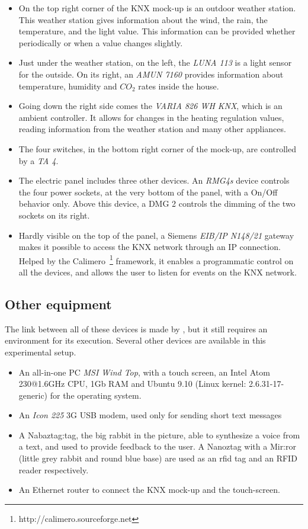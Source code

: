 \begin{itemize}
\item On the top right corner of the KNX mock-up is an outdoor weather station. This weather station gives information about the wind, the rain, the temperature, and the light value. This information can be provided whether periodically or when a value changes slightly.
\item Just under the weather station, on the left, the {\it LUNA 113} is a light sensor for the outside. On its right, an {\it AMUN 7160} provides information about temperature, humidity and $CO_2$ rates inside the house.
\item Going down the right side comes the {\it VARIA 826 WH KNX}, which is an ambient controller. It allows for changes in the heating regulation values, reading information from the weather station and many other appliances.
\item The four switches, in the bottom right corner of the mock-up, are controlled by a {\it TA 4}.
\item The electric panel includes three other devices. An {\it RMG4s} device controls the four power sockets, at the very bottom of the panel, with a On/Off behavior only. Above this device, a {DMG 2} controls the dimming of the two sockets on its right.
\item Hardly visible on the top of the panel, a Siemens {\it EIB/IP N148/21} gateway makes it possible to access the KNX network through an IP connection. Helped by the Calimero~\footnote{http://calimero.sourceforge.net} framework, it enables a programmatic control on all the devices, and allows the user to listen for events on the KNX network.
\end{itemize}

\subsection{Other equipment}

The link between all of these devices is made by \enti{}, but it still requires an environment for its execution. Several other devices are available in this experimental setup.

\begin{itemize}
\item An all-in-one PC {\it MSI Wind Top}, with a touch screen, an Intel Atom 230@1.6GHz CPU, 1Gb RAM and Ubuntu 9.10 (Linux kernel: 2.6.31-17-generic) for the operating system. 
\item An {\it Icon 225} 3G USB modem, used only for sending short text messages
\item A Nabaztag:tag, the big rabbit in the picture, able to synthesize a voice from a text, and used to provide feedback to the user. A Nanoztag with a Mir:ror (little grey rabbit and round blue base) are used as an \gls{rfid} tag and an RFID reader respectively.
\item An Ethernet router to connect the KNX mock-up and the touch-screen.
\end{itemize}



